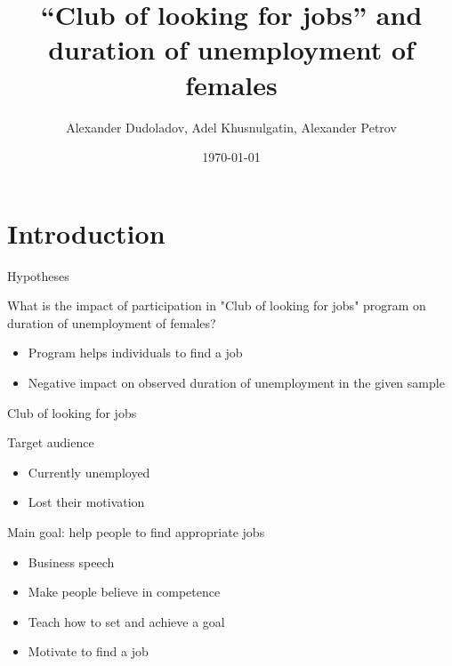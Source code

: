 \documentclass{beamer}
\title[]{``Club of looking for jobs'' and duration of unemployment of females} %
\author{Alexander Dudoladov, Adel Khusnulgatin, Alexander Petrov} %
\institute[New Economic School] %
{
New Economic School \\ %
\medskip
}
\date{\today} %
\begin{document}
\begin{frame}
\titlepage %
\end{frame}

\section{Introduction}


\begin{frame}{Hypotheses}
\begin{block}{What is the impact of participation in "Club of looking for jobs" program on duration of unemployment of females?}
\begin{itemize}
       \item Program helps individuals to find a job
       \item Negative impact on observed duration of unemployment in the given sample
\end{itemize}
\end{block}
\end{frame}

\begin{frame}{Club of looking for jobs}
\begin{block}{Target audience}
\begin{itemize}
       \item Currently unemployed
       \item Lost their motivation
\end{itemize}
\end{block}

\begin{block}{Main goal: help people to find appropriate jobs}
\begin{itemize}
       \item Business speech
       \item Make people believe in competence
       \item Teach how to set and achieve a goal
       \item Motivate to find a job
\end{itemize}
\end{block}

\end{frame}
\end{document}
